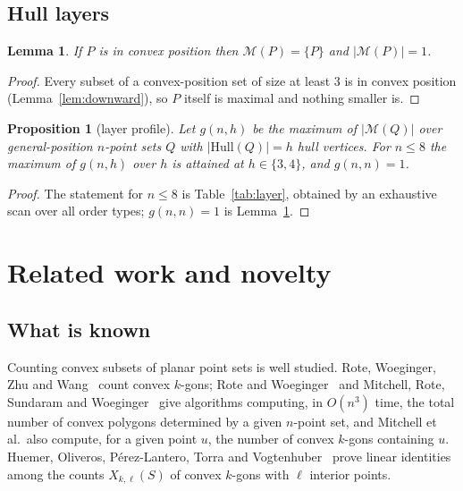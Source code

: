 \documentclass[11pt,a4paper]{article}
\newtheorem{lemma}[theorem]{Lemma}
\newtheorem{proposition}[theorem]{Proposition}
\theoremstyle{definition}
\newcommand{\M}{\mathcal{M}}
\newcommand{\hull}{\mathrm{Hull}}
\begin{document}
\subsection{Hull layers}

\begin{lemma}
\label{lem:convexpos}
If $P$ is in convex position then $\M(P)=\{P\}$ and $|\M(P)|=1$.
\end{lemma}

\begin{proof}
Every subset of a convex-position set of size at least $3$ is in convex position
(Lemma~\ref{lem:downward}), so $P$ itself is maximal and nothing smaller is.
\end{proof}

\begin{proposition}[layer profile]
\label{prop:layer}
Let $g(n,h)$ be the maximum of $|\M(Q)|$ over general-position $n$-point sets
$Q$ with $|\hull(Q)|=h$ hull vertices.  For $n\le 8$ the maximum of $g(n,h)$ over
$h$ is attained at $h\in\{3,4\}$, and $g(n,n)=1$.
\end{proposition}

\begin{proof}
The statement for $n\le 8$ is Table~\ref{tab:layer}, obtained by an exhaustive scan
over all order types; $g(n,n)=1$ is Lemma~\ref{lem:convexpos}.
\end{proof}

\section{Related work and novelty}
\label{sec:related}

\subsection{What is known}

Counting convex subsets of planar point sets is well studied.
Rote, Woeginger, Zhu and Wang~\cite{rote91} count convex $k$-gons; Rote and
Woeginger~\cite{rote92} and Mitchell, Rote, Sundaram and
Woeginger~\cite{mitchell95} give algorithms computing, in $O(n^3)$ time, the total
number of convex polygons determined by a given $n$-point set, and Mitchell et
al.\ also compute, for a given point $u$, the number of convex $k$-gons containing
$u$.  Huemer, Oliveros, P\'erez-Lantero, Torra and Vogtenhuber~\cite{huemer2022}
prove linear identities among the counts $X_{k,\ell}(S)$ of convex $k$-gons with
$\ell$ interior points.
\end{document}
